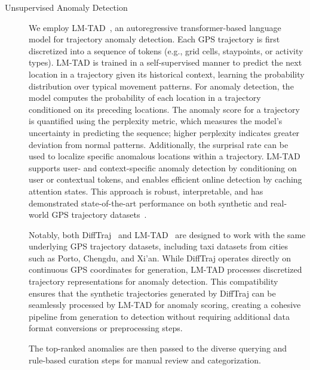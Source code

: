 \documentclass[runningheads]{llncs}
\begin{document}
\begin{description}
    \item[Unsupervised Anomaly Detection]  
    We employ LM-TAD~\cite{mbuyaTrajectoryAnomalyDetection2024}, an autoregressive transformer-based language model for trajectory anomaly detection. Each GPS trajectory is first discretized into a sequence of tokens (e.g., grid cells, staypoints, or activity types). LM-TAD is trained in a self-supervised manner to predict the next location in a trajectory given its historical context, learning the probability distribution over typical movement patterns. For anomaly detection, the model computes the probability of each location in a trajectory conditioned on its preceding locations. The anomaly score for a trajectory is quantified using the perplexity metric, which measures the model's uncertainty in predicting the sequence; higher perplexity indicates greater deviation from normal patterns. Additionally, the surprisal rate can be used to localize specific anomalous locations within a trajectory. LM-TAD supports user- and context-specific anomaly detection by conditioning on user or contextual tokens, and enables efficient online detection by caching attention states. This approach is robust, interpretable, and has demonstrated state-of-the-art performance on both synthetic and real-world GPS trajectory datasets~\cite{mbuyaTrajectoryAnomalyDetection2024}. 
    
    Notably, both DiffTraj~\cite{zhuDiffTrajGeneratingGPS2023} and LM-TAD~\cite{mbuyaTrajectoryAnomalyDetection2024} are designed to work with the same underlying GPS trajectory datasets, including taxi datasets from cities such as Porto, Chengdu, and Xi'an. While DiffTraj operates directly on continuous GPS coordinates for generation, LM-TAD processes discretized trajectory representations for anomaly detection. This compatibility ensures that the synthetic trajectories generated by DiffTraj can be seamlessly processed by LM-TAD for anomaly scoring, creating a cohesive pipeline from generation to detection without requiring additional data format conversions or preprocessing steps.
    
    The top-ranked anomalies are then passed to the diverse querying and rule-based curation steps for manual review and categorization.
    

\end{description}
\end{document}
